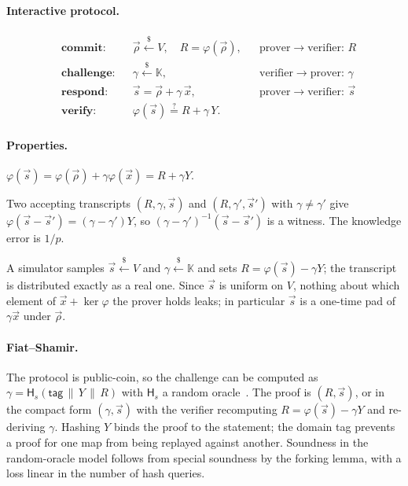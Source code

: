 \documentclass[10pt,a5paper]{article}
\newcommand{\K}[1]{#1}                      %
\newcommand{\K}[1]{{\color{ScalarCol}#1}}   %
\newcommand{\F}{\mathbb{K}}
\newcommand{\Hs}{\mathsf{H}_{s}}
\newcommand{\dtag}{\mathsf{tag}}
\newcommand{\vv}[1]{\vec{#1}}
\newcommand{\sample}{\stackrel{\$}{\leftarrow}}
\newcommand{\eqq}{\stackrel{?}{=}}
\begin{document}
\paragraph{Interactive protocol.}
\begin{align*}
  &\textbf{commit:}    && \vv{\rho} \sample V, \quad R = \varphi(\vv{\rho}), && \text{prover} \to \text{verifier: } R \\
  &\textbf{challenge:} && \K{\gamma} \sample \F,                              && \text{verifier} \to \text{prover: } \K{\gamma} \\
  &\textbf{respond:}   && \vv{s} = \vv{\rho} + \K{\gamma}\,\vv{x},            && \text{prover} \to \text{verifier: } \vv{s} \\
  &\textbf{verify:}    && \varphi(\vv{s}) \eqq R + \K{\gamma}\,Y .
\end{align*}

\paragraph{Properties.}
\begin{description}[nosep,leftmargin=1.2em]
\item[Completeness.] $\varphi(\vv{s}) = \varphi(\vv{\rho}) + \K{\gamma}\varphi(\vv{x}) = R + \K{\gamma}Y$.
\item[Special soundness.] Two accepting transcripts $(R,\K{\gamma},\vv{s})$ and
  $(R,\K{\gamma'},\vv{s}')$ with $\K{\gamma} \ne \K{\gamma'}$ give
  $\varphi(\vv{s}-\vv{s}') = (\K{\gamma}-\K{\gamma'})Y$, so
  $(\K{\gamma}-\K{\gamma'})^{-1}(\vv{s}-\vv{s}')$ is a witness. The knowledge
  error is $1/p$.
\item[Honest-verifier zero knowledge.] A simulator samples $\vv{s} \sample V$
  and $\K{\gamma} \sample \F$ and sets $R = \varphi(\vv{s}) - \K{\gamma}Y$; the
  transcript is distributed exactly as a real one. Since $\vv{s}$ is uniform on
  $V$, nothing about which element of $\vv{x} + \ker\varphi$ the prover holds
  leaks; in particular $\vv{s}$ is a one-time pad of $\K{\gamma}\vv{x}$ under
  $\vv{\rho}$.
\end{description}

\paragraph{Fiat--Shamir.} The protocol is public-coin, so the challenge can be
computed as $\K{\gamma} = \Hs(\dtag \,\|\, Y \,\|\, R)$ with $\Hs$ a random
oracle~\cite{fs86}. The proof is $(R,\vv{s})$, or in the compact form
$(\K{\gamma},\vv{s})$ with the verifier recomputing $R = \varphi(\vv{s}) - \K{\gamma}Y$
and re-deriving $\K{\gamma}$. Hashing $Y$ binds the proof to the statement; the
domain tag prevents a proof for one map from being replayed against another.
Soundness in the random-oracle model follows from special soundness by the
forking lemma, with a loss linear in the number of hash queries.
\end{document}
